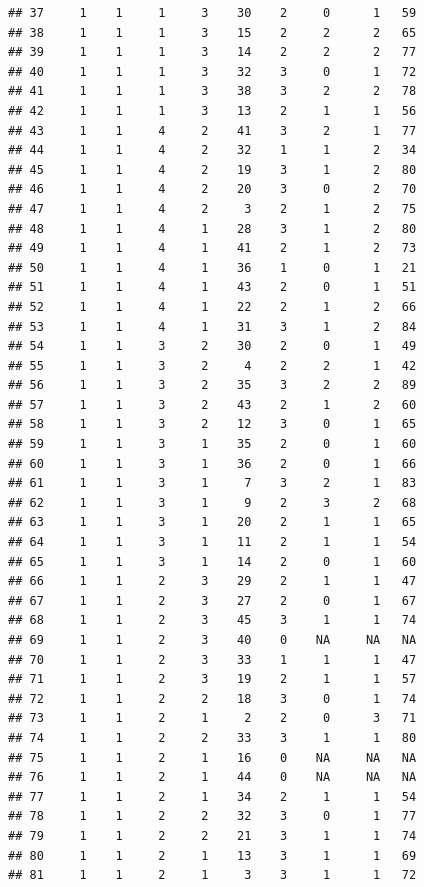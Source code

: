 \documentclass[krantz2,ChapterTOCs]{krantz}\usepackage{knitr}
\begin{document}
\begin{knitrout}
\begin{kframe}
\begin{verbatim}
## 37     1    1     1     3    30    2     0      1   59
## 38     1    1     1     3    15    2     2      2   65
## 39     1    1     1     3    14    2     2      2   77
## 40     1    1     1     3    32    3     0      1   72
## 41     1    1     1     3    38    3     2      2   78
## 42     1    1     1     3    13    2     1      1   56
## 43     1    1     4     2    41    3     2      1   77
## 44     1    1     4     2    32    1     1      2   34
## 45     1    1     4     2    19    3     1      2   80
## 46     1    1     4     2    20    3     0      2   70
## 47     1    1     4     2     3    2     1      2   75
## 48     1    1     4     1    28    3     1      2   80
## 49     1    1     4     1    41    2     1      2   73
## 50     1    1     4     1    36    1     0      1   21
## 51     1    1     4     1    43    2     0      1   51
## 52     1    1     4     1    22    2     1      2   66
## 53     1    1     4     1    31    3     1      2   84
## 54     1    1     3     2    30    2     0      1   49
## 55     1    1     3     2     4    2     2      1   42
## 56     1    1     3     2    35    3     2      2   89
## 57     1    1     3     2    43    2     1      2   60
## 58     1    1     3     2    12    3     0      1   65
## 59     1    1     3     1    35    2     0      1   60
## 60     1    1     3     1    36    2     0      1   66
## 61     1    1     3     1     7    3     2      1   83
## 62     1    1     3     1     9    2     3      2   68
## 63     1    1     3     1    20    2     1      1   65
## 64     1    1     3     1    11    2     1      1   54
## 65     1    1     3     1    14    2     0      1   60
## 66     1    1     2     3    29    2     1      1   47
## 67     1    1     2     3    27    2     0      1   67
## 68     1    1     2     3    45    3     1      1   74
## 69     1    1     2     3    40    0    NA     NA   NA
## 70     1    1     2     3    33    1     1      1   47
## 71     1    1     2     3    19    2     1      1   57
## 72     1    1     2     2    18    3     0      1   74
## 73     1    1     2     1     2    2     0      3   71
## 74     1    1     2     2    33    3     1      1   80
## 75     1    1     2     1    16    0    NA     NA   NA
## 76     1    1     2     1    44    0    NA     NA   NA
## 77     1    1     2     1    34    2     1      1   54
## 78     1    1     2     2    32    3     0      1   77
## 79     1    1     2     2    21    3     1      1   74
## 80     1    1     2     1    13    3     1      1   69
## 81     1    1     2     1     3    3     1      1   72

\end{verbatim}
\end{kframe}
\end{knitrout}
\end{document}
